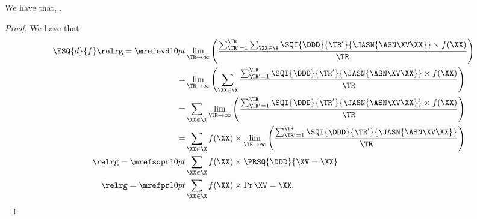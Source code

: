 \begin{proposition}
  We have that, \evexprprop.%
\end{proposition}

\begin{proof}
  We have that
  \begin{align*}
    \ESQ{d}{f} \relrg = {\mrefevd} 10pt &
    \lim_{\TR \rightarrow \infty}\left(\frac{\sum_{\TR' = 1}^{\TR}\sum_{\XX \in \X}\SQI{\DDD}{\TR'}{\JASN{\ASN\XV\XX}}\times f(\XX)}{\TR}\right)\\
          = & \lim_{\TR \rightarrow \infty}\left(\sum_{\XX \in \X}\frac{\sum_{\TR' = 1}^{\TR}\SQI{\DDD}{\TR'}{\JASN{\ASN\XV\XX}}\times f(\XX)}{\TR}\right)\\
          = & \sum_{\XX \in \X}\lim_{\TR \rightarrow \infty}\left(\frac{\sum_{\TR' = 1}^{\TR}\SQI{\DDD}{\TR'}{\JASN{\ASN\XV\XX}}\times f(\XX)}{\TR}\right)\\
          = & \sum_{\XX \in \X}f(\XX) \times \lim_{\TR \rightarrow \infty}\left(\frac{\sum_{\TR' = 1}^{\TR}\SQI{\DDD}{\TR'}{\JASN{\ASN\XV\XX}}}{\TR}\right)\\
      \relrg = {\mrefsqpr} 10pt & \sum_{\XX \in \X}f(\XX) \times \PRSQ{\DDD}{\XV = \XX}\\
      \relrg = {\mrefpr} 10pt & \sum_{\XX \in \X}f(\XX) \times \Pr{\XV = \XX}.
  \end{align*}
\end{proof}
